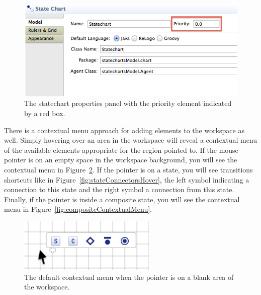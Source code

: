 \documentclass[11pt]{amsart}
\begin{document}
\begin{figure}
\begin{center}
\vspace{.2in}
\centerline {
\includegraphics[width=5in]{StatechartsImages/StatechartProperties.png}
}
\caption{The statechart properties panel with the priority element indicated by a red box.}
\label{fig:statechartProperties}
\end{center}
\end{figure}

There is a contextual menu approach for adding elements to the workspace as well. Simply hovering over an area in the workspace will reveal a contextual menu of the available elements appropriate for the region pointed to. If the mouse pointer is on an empty space in the workspace background, you will see the contextual menu in Figure~\ref{fig:defaultContextualMenu}. If the pointer is on a state, you will see transitions shortcuts like in Figure~\ref{fig:stateConnectorsHover}, the left symbol indicating a connection to this state and the right symbol a connection from this state. Finally, if the pointer is inside a composite state, you will see the contextual menu in Figure~\ref{fig:compositeContextualMenu}.


\begin{figure}

\begin{center}
\vspace{.2in}
\centerline {
\includegraphics[height=1in]{StatechartsImages/DefaultContextualMenu.png}
}
\caption{The default contextual menu when the pointer is on a blank area of the workspace.}
\label{fig:defaultContextualMenu}
\end{center}
\end{figure}
\end{document}
